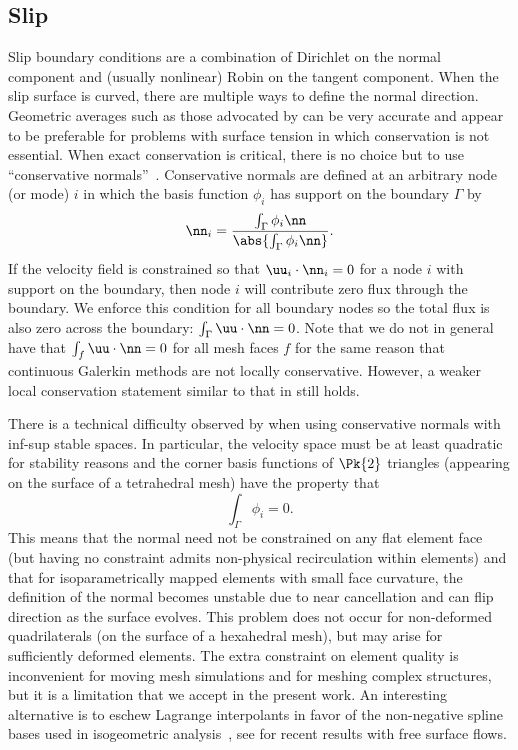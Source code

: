 \subsection{Slip}
Slip boundary conditions are a combination of Dirichlet on the normal component and (usually nonlinear) Robin on the tangent component.
When the slip surface is curved, there are multiple ways to define the normal direction.
Geometric averages such as those advocated by \cite{walkley2004calculation} can be very accurate and appear to be preferable for problems with surface tension in which conservation is not essential.
When exact conservation is critical, there is no choice but to use ``conservative normals''~\cite{lynch1980finite}.
Conservative normals are defined at an arbitrary node (or mode) $i$ in which the basis function $\phi_i$ has support on the boundary $\Gamma$ by
\begin{equation}
  \label{eq:slip:conservative-normal}
  \nn_i = \frac{\int_\Gamma \phi_i \nn}{\abs{\int_\Gamma \phi_i\nn}} .
\end{equation}
If the velocity field is constrained so that $\uu_i \cdot \nn_i = 0$ for a node $i$ with support on the boundary, then node $i$ will contribute zero flux through the boundary.
We enforce this condition for all boundary nodes so the total flux is also zero across the boundary: $\int_\Gamma \uu \cdot \nn = 0$.
Note that we do not in general have that $\int_f \uu \cdot \nn = 0$ for all mesh faces $f$ for the same reason that continuous Galerkin methods are not locally conservative.
However, a weaker local conservation statement similar to that in \cite{hughes2000continuous} still holds.

There is a technical difficulty observed by \cite{walkley2004calculation} when using conservative normals with inf-sup stable spaces.
In particular, the velocity space must be at least quadratic for stability reasons and the corner basis functions of $\Pk{2}$ triangles (appearing on the surface of a tetrahedral mesh) have the property that
\begin{equation*}
  \int_\Gamma \phi_i = 0 .
\end{equation*}
This means that the normal need not be constrained on any flat element face (but having no constraint admits non-physical recirculation within elements) and that for isoparametrically mapped elements with small face curvature, the definition of the normal becomes unstable due to near cancellation and can flip direction as the surface evolves.
This problem does not occur for non-deformed quadrilaterals (on the surface of a hexahedral mesh), but may arise for sufficiently deformed elements.
The extra constraint on element quality is inconvenient for moving mesh simulations and for meshing complex structures, but it is a limitation that we accept in the present work.
An interesting alternative is to eschew Lagrange interpolants in favor of the non-negative spline bases used in isogeometric analysis~\cite{cottrell2009isogeometric}, see \cite{akkerman2010isogeometric} for recent results with free surface flows.

